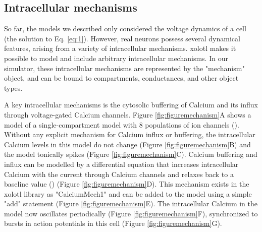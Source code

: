 \documentclass{frontiersSCNS} %
\begin{document}
%
%
%
%
%
%



\subsection{Intracellular mechanisms}

So far, the models we described only considered the voltage dynamics of a cell (the solution to Eq. \ref{eq:1}). However, real neurons possess several dynamical features, arising from a variety of intracellular mechanisms. xolotl makes it possible to model and include arbitrary intracellular mechanisms. In our simulator, these intracellular mechanisms are represented by the "mechanism" object, and can be bound to compartments, conductances, and other object types.

A key intracellular mechanisms is the cytosolic buffering of Calcium and its influx through voltage-gated Calcium channels. Figure \ref{fig:figuremechanism}A shows a model of a single-compartment model with 8 populations of ion channels (\cite{liuModelNeuronActivityDependent1998}). Without any explicit mechanism for Calcium influx or buffering, the intracellular Calcium levels in this model do not change (Figure \ref{fig:figuremechanism}B) and the model tonically spikes (Figure \ref{fig:figuremechanism}C). Calcium buffering and influx can be modelled by a differential equation that increases intracellular Calcium with the current through Calcium channels and relaxes back to a baseline value (\cite{liuModelNeuronActivityDependent1998, prinzAlternativeHandtuningConductancebased2003, dayanTheoreticalNeuroscience2001}) (Figure \ref{fig:figuremechanism}D). This mechanism exists in the xolotl library as "CalciumMech1" and can be added to the model using a simple "add" statement (Figure \ref{fig:figuremechanism}E). The intracellular Calcium in the model now oscillates periodically (Figure \ref{fig:figuremechanism}F), synchronized to bursts in action potentials in this cell (Figure \ref{fig:figuremechanism}G).
\end{document}
